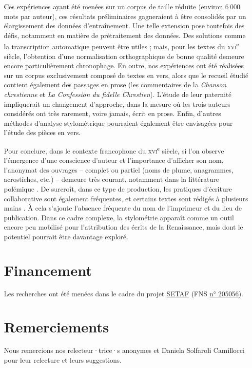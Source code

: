 \documentclass[final, fra]{anthology-ch}
\begin{document}
Ces expériences ayant été menées sur un corpus de taille réduite (environ $6~000$ mots par auteur), ces résultats préliminaires gagneraient à être consolidés par un élargissement des données d’entraînement. Une telle extension pose toutefois des défis, notamment en matière de prétraitement des données. Des solutions comme la transcription automatique peuvent être utiles ; mais, pour les textes du \textsc{xvi}\textsuperscript{e} siècle, l’obtention d’une normalisation orthographique de bonne qualité demeure encore particulièrement chronophage. En outre, nos expériences ont été réalisées sur un corpus exclusivement composé de textes en vers, alors que le recueil étudié contient également des passages en prose (les commentaires de la \textit{Chanson chrestienne} et \textit{La Confession du fidelle Chrestien}). L’étude de leur paternité impliquerait un changement d’approche, dans la mesure où les trois auteurs considérés ont très rarement, voire jamais, écrit en prose. Enfin, d’autres méthodes d’analyse stylométrique pourraient également être envisagées pour l’étude des pièces en vers.

Pour conclure, dans le contexte francophone du \textsc{xvi}\textsuperscript{e} siècle, si l’on observe l’émergence d’une conscience d’auteur et l’importance d’afficher son nom, l’anonymat des ouvrages – complet ou partiel (noms de plume, anagrammes, acrostiches, etc.) – demeure très courant, notamment dans la littérature polémique \cite{dauvois_acrostiches_2008,bodenmann_lauteur_2009,walsby_voix_2009,walsby_lauteur_2012}. De surcroît, dans ce type de production, les pratiques d’écriture collaborative sont également fréquentes, et certains textes sont rédigés à plusieurs mains \cite{szczech2021groupe,desrosiers_atelier_2014,reach-ngo_du_2015}. À cela s’ajoute l’absence fréquente du nom de l’imprimeur et du lieu de publication. Dans ce cadre complexe, la stylométrie apparaît comme un outil encore peu mobilisé pour l’attribution des écrits de la Renaissance, mais dont le potentiel pourrait être davantage exploré.

\section*{Financement}

Les recherches ont été menées dans le cadre du projet \href{https://www.unige.ch/setaf/}{\underline{SETAF}} (FNS \href{https://data.snf.ch/grants/grant/205056}{\underline{n° 205056}}).

\section*{Remerciements}
Nous remercions nos relecteur·trice·s anonymes et Daniela Solfaroli Camillocci pour leur relecture et leurs suggestions.
\end{document}
